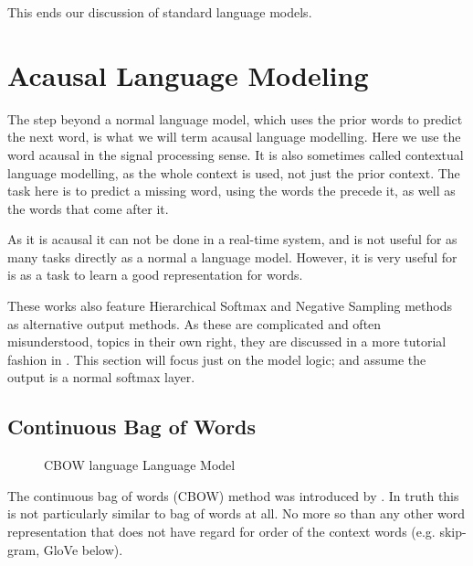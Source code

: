 \documentclass[parskip]{komatufte}
\begin{document}
This ends our discussion of standard language models.

\section{Acausal Language Modeling}\label{sec:acausal-language-modeling}
The step beyond a normal language model,
which uses the prior words to predict the next word, is what we will term acausal language modelling.
Here we use the word acausal in the signal processing sense.
It is also sometimes called contextual language modelling, as the whole context is used, not just the prior context.
The task here is to predict a missing word, using the words the precede it, as well as the words that come after it.

As it is acausal it can not be done in a real-time system, and is not useful for as many tasks directly as a normal a language model. 
However, it is very useful for is as a task to learn a good representation for words.




These works also feature Hierarchical Softmax and Negative Sampling methods as alternative output methods.
As these are complicated and often misunderstood, topics in their own right, they are discussed in a more tutorial fashion in .
This section will focus just on the model logic; and assume the output is a normal softmax layer.

\subsection{Continuous Bag of Words}\label{sec:cbow}
\begin{figure}
	\caption{CBOW language Language Model}
	\label{fig:cbow}
	\centering
	 
\end{figure}

The continuous bag of words (CBOW) method was introduced by .
In truth this is not particularly similar to bag of words at all.
No more so than any other word representation that does not have regard for order of the context words (e.g. skip-gram, GloVe below).
\end{document}
